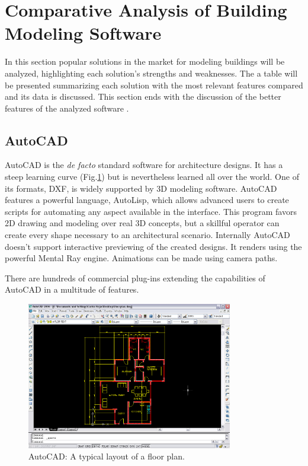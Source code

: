 \section{Comparative Analysis of Building Modeling Software}

In this section popular solutions in the market for modeling buildings will be analyzed,
highlighting each solution's strengths and weaknesses.
The a table will be presented summarizing each solution with the most relevant features compared and its data is discussed.
This section ends with the discussion of the better features of the analyzed software .

\subsection{AutoCAD}
AutoCAD \cite{SITE-AUTOCAD} is the \emph{de facto} standard software for architecture designs.
It has a steep learning curve (Fig.\ref{FIG-AUTOCAD}) but is nevertheless
learned all over the world.
One of its formats, DXF, is widely supported by 3D modeling software.
AutoCAD features a powerful language, AutoLisp, which allows advanced users to create scripts for
automating any aspect available in the interface.
This program favors 2D drawing and modeling over real 3D concepts,
but a skillful operator can create every shape necessary to an architectural scenario.
Internally AutoCAD doesn't support interactive previewing of the created designs.
It renders using the powerful Mental Ray\nocite{SITE-MENTAL} engine.
Animations can be made using camera paths.

There are hundreds of commercial plug-ins extending the capabilities of AutoCAD in a multitude of features.

\begin{figure}[!ht]
    \centering
    \includegraphics[width=9cm]{gfx/autocad-1.png}
    \caption{AutoCAD: A typical layout of a floor plan.}
    \label{FIG-AUTOCAD}
\end{figure}

